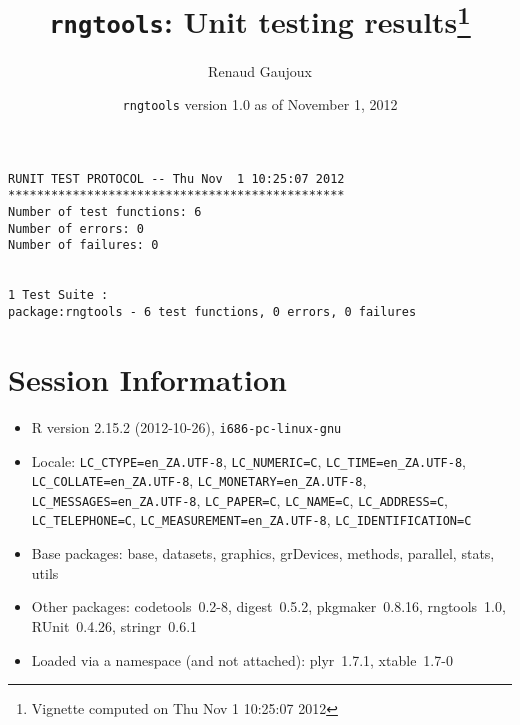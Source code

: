 \documentclass[10pt]{article}
\author{Renaud Gaujoux}
\title{\texttt{rngtools}: Unit testing results\footnote{Vignette computed  on Thu Nov  1 10:25:07 2012}}
\date{\texttt{rngtools} version 1.0 as of November  1, 2012}
\begin{document}
\maketitle

\begin{verbatim}
RUNIT TEST PROTOCOL -- Thu Nov  1 10:25:07 2012 
*********************************************** 
Number of test functions: 6 
Number of errors: 0 
Number of failures: 0 

 
1 Test Suite : 
package:rngtools - 6 test functions, 0 errors, 0 failures
\end{verbatim}

\section*{Session Information}
\begin{itemize}\raggedright
  \item R version 2.15.2 (2012-10-26), \verb|i686-pc-linux-gnu|
  \item Locale: \verb|LC_CTYPE=en_ZA.UTF-8|, \verb|LC_NUMERIC=C|, \verb|LC_TIME=en_ZA.UTF-8|, \verb|LC_COLLATE=en_ZA.UTF-8|, \verb|LC_MONETARY=en_ZA.UTF-8|, \verb|LC_MESSAGES=en_ZA.UTF-8|, \verb|LC_PAPER=C|, \verb|LC_NAME=C|, \verb|LC_ADDRESS=C|, \verb|LC_TELEPHONE=C|, \verb|LC_MEASUREMENT=en_ZA.UTF-8|, \verb|LC_IDENTIFICATION=C|
  \item Base packages: base, datasets, graphics, grDevices, methods,
    parallel, stats, utils
  \item Other packages: codetools~0.2-8, digest~0.5.2, pkgmaker~0.8.16,
    rngtools~1.0, RUnit~0.4.26, stringr~0.6.1
  \item Loaded via a namespace (and not attached): plyr~1.7.1,
    xtable~1.7-0
\end{itemize}
\end{document}
